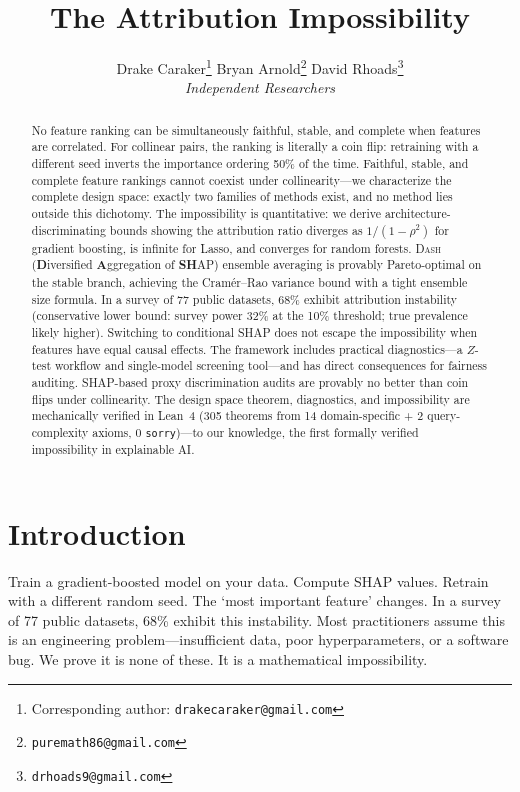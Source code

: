 \documentclass{article}
\title{The Attribution Impossibility}
\author{
  Drake Caraker\thanks{Corresponding author: \texttt{drakecaraker@gmail.com}} \quad
  Bryan Arnold\thanks{\texttt{puremath86@gmail.com}} \quad
  David Rhoads\thanks{\texttt{drhoads9@gmail.com}} \\[4pt]
  \textit{Independent Researchers}
}
\newcommand{\DASH}{\textsc{Dash}}
\begin{document}
\maketitle

\begin{abstract}
No feature ranking can be simultaneously faithful, stable, and complete when features are correlated. For collinear pairs, the ranking is literally a coin flip: retraining with a different seed inverts the importance ordering 50\% of the time.
Faithful, stable, and complete feature rankings cannot coexist under collinearity---we characterize the complete design space: exactly two families of methods exist, and no method lies outside this dichotomy.
The impossibility is quantitative: we derive architecture-discriminating bounds showing the attribution ratio diverges as $1/(1{-}\rho^2)$ for gradient boosting, is infinite for Lasso, and converges for random forests.
\DASH{} (\textbf{D}iversified \textbf{A}ggregation of \textbf{SH}AP) ensemble averaging is provably Pareto-optimal on the stable branch, achieving the Cram\'er--Rao variance bound with a tight ensemble size formula.
In a survey of 77 public datasets, 68\% exhibit attribution instability (conservative lower bound: survey power 32\% at the 10\% threshold; true prevalence likely higher).
Switching to conditional SHAP does not escape the impossibility when features have equal causal effects.
The framework includes practical diagnostics---a $Z$-test workflow and single-model screening tool---and has direct consequences for fairness auditing.
SHAP-based proxy discrimination audits are provably no better than coin flips under collinearity.
The design space theorem, diagnostics, and impossibility are mechanically verified in Lean~4 (305 theorems from 14 domain-specific + 2 query-complexity axioms, 0 \texttt{sorry})---to our knowledge, the first formally verified impossibility in explainable AI.
\end{abstract}

\section{Introduction}
\label{sec:intro}

Train a gradient-boosted model on your data. Compute SHAP values. Retrain with a different random seed. The `most important feature' changes. In a survey of 77 public datasets, 68\% exhibit this instability. Most practitioners assume this is an engineering problem---insufficient data, poor hyperparameters, or a software bug. We prove it is none of these. It is a mathematical impossibility.
\end{document}
